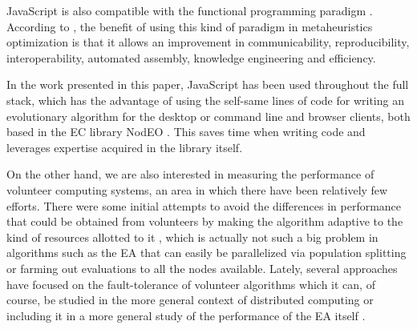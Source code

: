 \documentclass[journal,onecolumn]{IEEEtran}
\begin{document}
JavaScript is also compatible with the functional programming paradigm \cite{Cousineau1998,MacLennan1990,Thompson1996}.
According to \cite{swanresearch2015}, the benefit of using this kind of paradigm in
metaheuristics optimization is that it allows an improvement in communicability,
reproducibility, interoperability, automated assembly, knowledge engineering
and efficiency.

In the work presented in this paper, JavaScript has been used throughout the full
stack, which has the advantage of using the self-same lines of code for
writing an evolutionary algorithm for the
desktop or command line and browser clients, both based in the EC
library NodEO \cite{DBLP:conf/gecco/GuervosVGES14}. This saves time 
when writing code and leverages 
expertise acquired
 in the library itself. 

On the other hand, we are also interested in measuring the performance
of volunteer computing systems, an area in which there have been
relatively few efforts.
There were some initial attempts to avoid the differences in performance
that could be obtained from volunteers  by making
the algorithm adaptive to the kind of resources allotted to it
\cite{milani2004online}, which is actually not such a big problem in
algorithms such as the EA that can easily be
parallelized via population splitting or farming out evaluations to all
the nodes available. Lately, several approaches have focused on the
fault-tolerance of volunteer algorithms
\cite{gonzalez2010characterizing} which it can, of course, be studied in
the more general context of distributed computing 
\cite{nogueras2015studying} or including it in a more general study of the
performance of the EA itself
\cite{DBLP:journals/gpem/LaredoBGVAGF14}.
\end{document}
